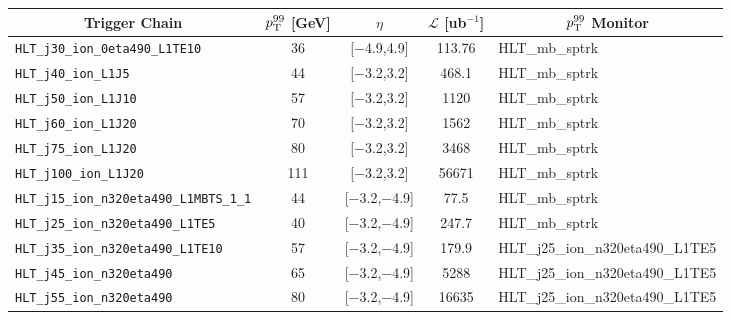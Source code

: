 \begin{table}[!ht]
    \centering
    \begin{tabular}{ | c | c | c | c | c |}
        \hline
        \textbf{Trigger Chain} &  \textbf{$p_{\text{T}}^{99}$ [GeV]} & \textbf{$\eta$} & \textbf{$\mathscr{L}$ [ub$^{-1}$]} & \textbf{$p_{\text{T}}^{99}$ Monitor}\\
        \hline
        \multicolumn{1}{|l|}{\texttt{HLT\_j30\_ion\_0eta490\_L1TE10}}            & 36  & [$-$4.9,4.9]      & 113.76 &  \multicolumn{1}{l|}{\scriptsize HLT\_mb\_sptrk} \\ \hline
        \multicolumn{1}{|l|}{\texttt{HLT\_j40\_ion\_L1J5}}                       & 44  & [$-$3.2,3.2]      & 468.1 &  \multicolumn{1}{l|}{\scriptsize HLT\_mb\_sptrk}\\ \hline
        \multicolumn{1}{|l|}{\texttt{HLT\_j50\_ion\_L1J10}}                      & 57  & [$-$3.2,3.2]      & 1120 &  \multicolumn{1}{l|}{\scriptsize HLT\_mb\_sptrk}\\ \hline
        \multicolumn{1}{|l|}{\texttt{HLT\_j60\_ion\_L1J20}}                      & 70  & [$-$3.2,3.2]      & 1562 &  \multicolumn{1}{l|}{\scriptsize HLT\_mb\_sptrk}\\ \hline
        \multicolumn{1}{|l|}{\texttt{HLT\_j75\_ion\_L1J20}}                      & 80  & [$-$3.2,3.2]      & 3468 &  \multicolumn{1}{l|}{\scriptsize HLT\_mb\_sptrk}\\ \hline
        \multicolumn{1}{|l|}{\texttt{HLT\_j100\_ion\_L1J20}}                     & 111 & [$-$3.2,3.2]      & 56671 &  \multicolumn{1}{l|}{\scriptsize HLT\_mb\_sptrk}\\ \hline
        \multicolumn{1}{|l|}{\texttt{HLT\_j15\_ion\_n320eta490\_L1MBTS\_1\_1}}   & 44  & [$-$3.2,$-$4.9]   & 77.5 &  \multicolumn{1}{l|}{\scriptsize HLT\_mb\_sptrk}\\ \hline
        \multicolumn{1}{|l|}{\texttt{HLT\_j25\_ion\_n320eta490\_L1TE5}}          & 40  & [$-$3.2,$-$4.9]   & 247.7 &  \multicolumn{1}{l|}{\scriptsize HLT\_mb\_sptrk}\\ \hline
        \multicolumn{1}{|l|}{\texttt{HLT\_j35\_ion\_n320eta490\_L1TE10}}         & 57  & [$-$3.2,$-$4.9]   & 179.9 &  \multicolumn{1}{l|}{\tiny HLT\_j25\_ion\_n320eta490\_L1TE5}\\ \hline
        \multicolumn{1}{|l|}{\texttt{HLT\_j45\_ion\_n320eta490}}                 & 65  & [$-$3.2,$-$4.9]   & 5288 &  \multicolumn{1}{l|}{\tiny HLT\_j25\_ion\_n320eta490\_L1TE5}\\ \hline
        \multicolumn{1}{|l|}{\texttt{HLT\_j55\_ion\_n320eta490}}                 & 80  & [$-$3.2,$-$4.9]   & 16635 &  \multicolumn{1}{l|}{\tiny HLT\_j25\_ion\_n320eta490\_L1TE5}\\ \hline

\end{tabular}
\end{table}
